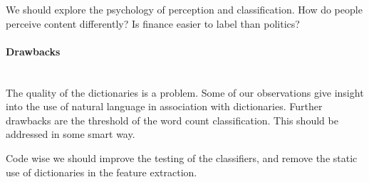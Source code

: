 We should explore the psychology of perception and classification. How do
people perceive content differently? Is finance easier to label than politics?

\paragraph{Drawbacks}
\hspace{0pt}\\
The quality of the dictionaries is a problem. Some of our observations give
insight into the use of natural language in association with dictionaries. 
Further drawbacks are the threshold of the word count classification. This
should be addressed in some smart way. 

Code wise we should improve the testing of the classifiers, and remove the
static use of dictionaries in the feature extraction.  
%
